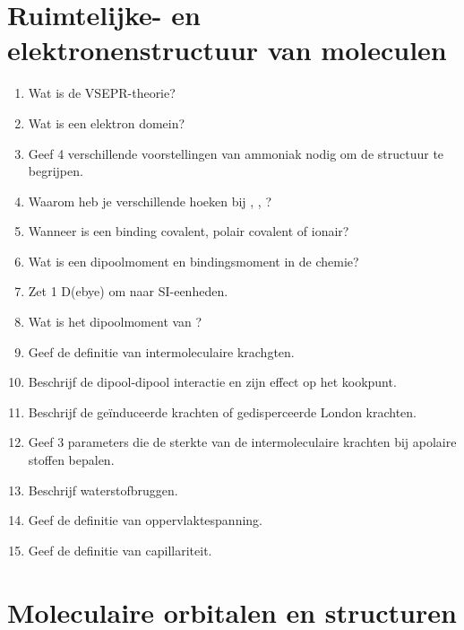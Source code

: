 \documentclass[a4paper,12pt]{article}
\begin{document}
    \section{Ruimtelijke- en elektronenstructuur van moleculen}

    \begin{enumerate}
        \item Wat is de VSEPR-theorie?
        \item Wat is een elektron domein?
        \item Geef 4 verschillende voorstellingen van ammoniak nodig om de structuur te begrijpen.
        \item Waarom heb je verschillende hoeken bij , , ?
        \item Wanneer is een binding covalent, polair covalent of ionair?
        \item Wat is een dipoolmoment en bindingsmoment in de chemie?
        \item Zet 1 D(ebye) om naar SI-eenheden.
        \item Wat is het dipoolmoment van ?
        \item Geef de definitie van intermoleculaire krachgten.
        \item Beschrijf de dipool-dipool interactie en zijn effect op het kookpunt.
        \item Beschrijf de ge\"induceerde krachten of gedisperceerde London krachten.
        \item Geef 3 parameters die de sterkte van de intermoleculaire krachten bij apolaire stoffen bepalen.
        \item Beschrijf waterstofbruggen.
        \item Geef de definitie van oppervlaktespanning.
        \item Geef de definitie van capillariteit.
    \end{enumerate}

    \section{Moleculaire orbitalen en structuren}
\end{document}

